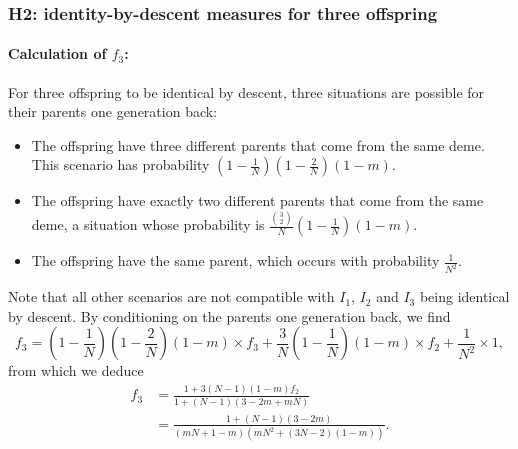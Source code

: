 \documentclass[11pt]{article}
\begin{document}
\subsubsection*{H2: identity-by-descent measures for three offspring}

\paragraph{Calculation of $f_{3}$:}
For three offspring to be identical by descent, three situations are possible for their parents one generation back: 
\begin{itemize}
\item The offspring have three different parents that come from the same deme. This scenario has probability $\left(1-\frac{1}{N}\right)\left(1-\frac{2}{N}\right)(1-m)$. 
\item The offspring have exactly two different parents that come from the same deme, a situation whose probability is $\frac{\binom{3}{2}}{N}\left(1-\frac{1}{N}\right)(1-m)$. 
\item The offspring have the same parent, which occurs with probability  $\frac{1}{N^2}$.
\end{itemize}
Note that all other scenarios are not compatible with $I_1$, $I_2$ and $I_3$ being identical by descent. By conditioning on the parents one generation back, we find 
\begin{equation}
f_{3}=\left(1-\frac{1}{N}\right)\left(1-\frac{2}{N}\right)(1-m)\times f_{3}
+\frac{3}{N}\left(1-\frac{1}{N}\right)(1-m)\times f_{2}
+\frac{1}{N^2}\times 1,
\end{equation}
from which we deduce
\begin{align}
f_{3}&=\frac{1+3(N-1)(1-m)f_{2}}{1+(N-1)(3-2m+mN)}\nonumber\\
&=\frac{1+(N-1)(3-2m)}{(mN+1-m)(mN^2+(3N-2)(1-m))}.
\end{align}


\end{document}
